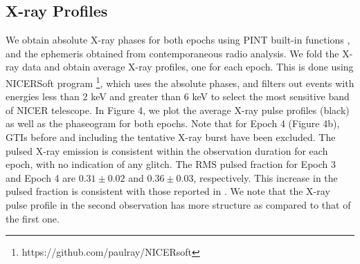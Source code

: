 \documentclass[twocolumn]{emulateapj}
\begin{document}

 


\subsection{X-ray Profiles}
 
We obtain absolute X-ray phases for both epochs using PINT built-in functions \citep{Luo2019}, and the ephemeris obtained from contemporaneous radio analysis. We fold the X-ray data and obtain average X-ray profiles, one for each epoch. This is done using NICERSoft program \footnote{https://github.com/paulray/NICERsoft}, which uses the absolute phases, and filters out events with energies less than 2 keV and greater than 6 keV to select the most sensitive band of NICER telescope. In Figure 4, we plot the average X-ray pulse profiles (black) as well as the phaseogram for both epochs. Note that for Epoch 4 (Figure 4b), GTIs before and including the tentative X-ray burst have been excluded. The pulsed X-ray emission is consistent within the observation duration for each epoch, with no indication of any glitch. The RMS pulsed fraction \citep{an2015} for Epoch 3 and Epoch 4 are $0.31 \pm 0.02$ and $0.36 \pm 0.03$, respectively. This increase in the pulsed fraction is consistent with those reported in \cite{hu2020}. We note that the X-ray pulse profile in the second observation has more structure as compared to that of the first one.
\end{document}
